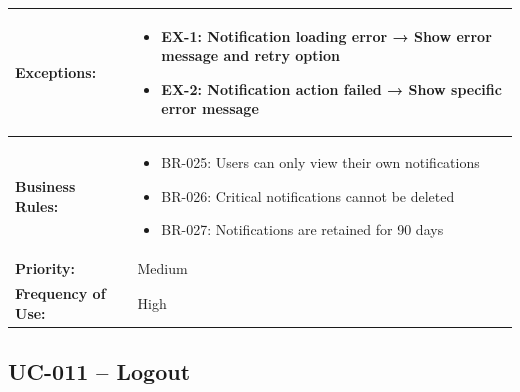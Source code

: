 \documentclass[12pt,a4paper]{article}
\begin{document}
\begin{longtable}{|p{4.5cm}|p{10.5cm}|}
\hline
\textbf{Exceptions:} &
\begin{itemize}
  \item EX-1: Notification loading error → Show error message and retry option
  \item EX-2: Notification action failed → Show specific error message
\end{itemize} \\
\hline
\textbf{Business Rules:} &
\begin{itemize}
  \item BR-025: Users can only view their own notifications
  \item BR-026: Critical notifications cannot be deleted
  \item BR-027: Notifications are retained for 90 days
\end{itemize} \\
\hline
\textbf{Priority:} & Medium \\
\hline
\textbf{Frequency of Use:} & High \\
\hline
\end{longtable}

\subsection{UC-011 – Logout}
\end{document}

